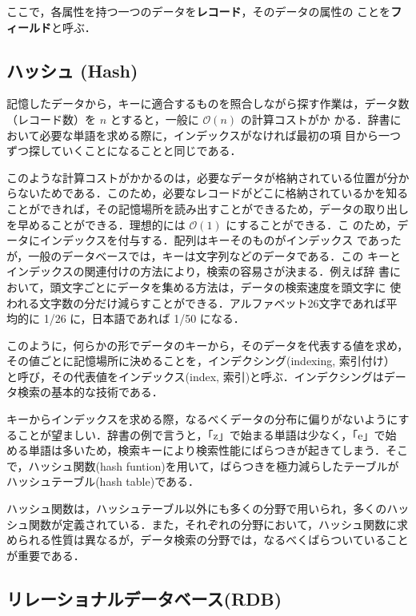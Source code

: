 ここで，各属性を持つ一つのデータを\textbf{レコード}，そのデータの属性の
ことを\textbf{フィールド}と呼ぶ．

\subsection{ハッシュ (Hash)}

記憶したデータから，キーに適合するものを照合しながら探す作業は，データ数
（レコード数）を $n$ とすると，一般に $\mathcal{O}(n)$ の計算コストがか
かる．辞書において必要な単語を求める際に，インデックスがなければ最初の項
目から一つずつ探していくことになることと同じである．

このような計算コストがかかるのは，必要なデータが格納されている位置が分か
らないためである．このため，必要なレコードがどこに格納されているかを知る
ことができれば，その記憶場所を読み出すことができるため，データの取り出し
を早めることができる．理想的には $\mathcal{O}(1)$ にすることができる．こ
のため，データにインデックスを付与する．配列はキーそのものがインデックス
であったが，一般のデータベースでは，キーは文字列などのデータである．この
キーとインデックスの関連付けの方法により，検索の容易さが決まる．例えば辞
書において，頭文字ごとにデータを集める方法は，データの検索速度を頭文字に
使われる文字数の分だけ減らすことができる．アルファベット26文字であれば平
均的に 1/26 に，日本語であれば 1/50 になる．

このように，何らかの形でデータのキーから，そのデータを代表する値を求め，
その値ごとに記憶場所に決めることを，インデクシング(indexing, 索引付け）
と呼び，その代表値をインデックス(index, 索引)と呼ぶ．インデクシングはデー
タ検索の基本的な技術である．

キーからインデックスを求める際，なるべくデータの分布に偏りがないようにす
ることが望ましい．辞書の例で言うと，「z」で始まる単語は少なく，「e」で始
める単語は多いため，検索キーにより検索性能にばらつきが起きてしまう．そこ
で，ハッシュ関数(hash funtion)を用いて，ばらつきを極力減らしたテーブルが
ハッシュテーブル(hash table)である．

ハッシュ関数は，ハッシュテーブル以外にも多くの分野で用いられ，多くのハッ
シュ関数が定義されている．また，それぞれの分野において，ハッシュ関数に求
められる性質は異なるが，データ検索の分野では，なるべくばらついていること
が重要である．

\subsection{リレーショナルデータベース(RDB)}

